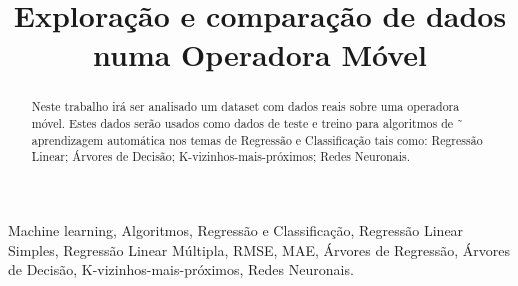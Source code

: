 \title{Exploração e comparação de dados numa Operadora Móvel}

\author{
\and
{}
\and
{}
}

\maketitle

\begin{abstract}
Neste trabalho irá ser analisado um dataset com
dados reais sobre uma operadora móvel. Estes dados
serão usados como dados de teste e treino para algoritmos de ˜
aprendizagem automática nos temas de Regressão e Classificação tais como: Regressão Linear; Árvores de Decisão; K-vizinhos-mais-próximos; Redes Neuronais.
\end{abstract}

\begin{IEEEkeywords}
Machine learning, Algoritmos, Regressão e Classificação, Regressão Linear Simples, Regressão Linear Múltipla, RMSE, MAE, Árvores de Regressão, Árvores de Decisão, K-vizinhos-mais-próximos, Redes Neuronais.
\end{IEEEkeywords}